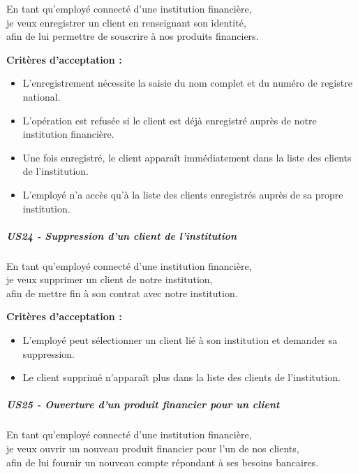 En tant qu'employé connecté d'une institution financière,\\
je veux enregistrer un client en renseignant son identité,\\
afin de lui permettre de souscrire à nos produits financiers.

\textbf{Critères d'acceptation :}

\begin{itemize}
\tightlist
\item
  L'enregistrement nécessite la saisie du nom complet et du numéro de
  registre national.
\item
  L'opération est refusée si le client est déjà enregistré auprès de
  notre institution financière.
\item
  Une fois enregistré, le client apparaît immédiatement dans la liste
  des clients de l'institution.
\item
  L'employé n'a accès qu'à la liste des clients enregistrés auprès de sa
  propre institution.
\end{itemize}

\hypertarget{us24---suppression-dun-client-de-linstitution}{%
\subparagraph{US24 - Suppression d'un client de
l'institution}\label{us24---suppression-dun-client-de-linstitution}}

En tant qu'employé connecté d'une institution financière,\\
je veux supprimer un client de notre institution,\\
afin de mettre fin à son contrat avec notre institution.

\textbf{Critères d'acceptation :}

\begin{itemize}
\tightlist
\item
  L'employé peut sélectionner un client lié à son institution et
  demander sa suppression.
\item
  Le client supprimé n'apparaît plus dans la liste des clients de
  l'institution.
\end{itemize}

\hypertarget{us25---ouverture-dun-produit-financier-pour-un-client}{%
\subparagraph{US25 - Ouverture d'un produit financier pour un
client}\label{us25---ouverture-dun-produit-financier-pour-un-client}}

En tant qu'employé connecté d'une institution financière,\\
je veux ouvrir un nouveau produit financier pour l'un de nos clients,\\
afin de lui fournir un nouveau compte répondant à ses besoins bancaires.

